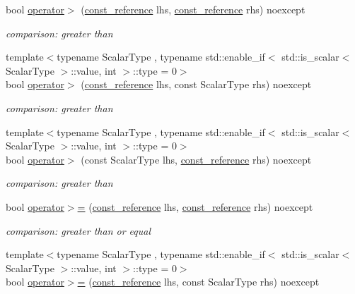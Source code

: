 \begin{DoxyCompactItemize}
bool \hyperlink{classnlohmann_1_1basic__json_a87db51b6b936fb2ea293cdbc8702dcb8}{operator$>$} (\hyperlink{classnlohmann_1_1basic__json_ab8a1c33ee7b154fc41ca2545aa9724e6}{const\+\_\+reference} lhs, \hyperlink{classnlohmann_1_1basic__json_ab8a1c33ee7b154fc41ca2545aa9724e6}{const\+\_\+reference} rhs) noexcept
\begin{DoxyCompactList}\small\item\em comparison\+: greater than \end{DoxyCompactList}\item 
{\footnotesize template$<$typename Scalar\+Type , typename std\+::enable\+\_\+if$<$ std\+::is\+\_\+scalar$<$ Scalar\+Type $>$\+::value, int $>$\+::type  = 0$>$ }\\bool \hyperlink{classnlohmann_1_1basic__json_a412895af9a582869a4d369a64fb1b6d6}{operator$>$} (\hyperlink{classnlohmann_1_1basic__json_ab8a1c33ee7b154fc41ca2545aa9724e6}{const\+\_\+reference} lhs, const Scalar\+Type rhs) noexcept
\begin{DoxyCompactList}\small\item\em comparison\+: greater than \end{DoxyCompactList}\item 
{\footnotesize template$<$typename Scalar\+Type , typename std\+::enable\+\_\+if$<$ std\+::is\+\_\+scalar$<$ Scalar\+Type $>$\+::value, int $>$\+::type  = 0$>$ }\\bool \hyperlink{classnlohmann_1_1basic__json_a124c319566198d9f092c5bebea46ce77}{operator$>$} (const Scalar\+Type lhs, \hyperlink{classnlohmann_1_1basic__json_ab8a1c33ee7b154fc41ca2545aa9724e6}{const\+\_\+reference} rhs) noexcept
\begin{DoxyCompactList}\small\item\em comparison\+: greater than \end{DoxyCompactList}\item 
bool \hyperlink{classnlohmann_1_1basic__json_a74a943800c7f103d0990d7eef82c6453}{operator$>$=} (\hyperlink{classnlohmann_1_1basic__json_ab8a1c33ee7b154fc41ca2545aa9724e6}{const\+\_\+reference} lhs, \hyperlink{classnlohmann_1_1basic__json_ab8a1c33ee7b154fc41ca2545aa9724e6}{const\+\_\+reference} rhs) noexcept
\begin{DoxyCompactList}\small\item\em comparison\+: greater than or equal \end{DoxyCompactList}\item 
{\footnotesize template$<$typename Scalar\+Type , typename std\+::enable\+\_\+if$<$ std\+::is\+\_\+scalar$<$ Scalar\+Type $>$\+::value, int $>$\+::type  = 0$>$ }\\bool \hyperlink{classnlohmann_1_1basic__json_a68e3a92b3d9be1faa05c92d096299189}{operator$>$=} (\hyperlink{classnlohmann_1_1basic__json_ab8a1c33ee7b154fc41ca2545aa9724e6}{const\+\_\+reference} lhs, const Scalar\+Type rhs) noexcept

\end{DoxyCompactItemize}
